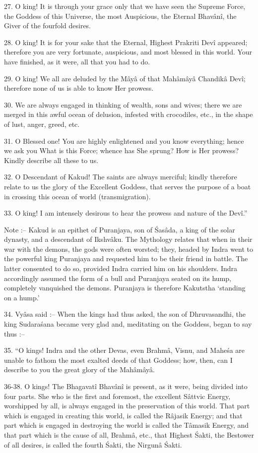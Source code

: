 27. O king! It is through your grace only that we have seen the Supreme Force, the Goddess of this Universe, the most Auspicious, the Eternal Bhav\^an\^i, the Giver of the fourfold desires.

28. O king! It is for your sake that the Eternal, Highest Prakriti Dev\^i appeared; therefore you are very fortunate, auspicious, and most blessed in this world. Your have finished, as it were, all that you had to do.

29. O king! We all are deluded by the M\^ay\^a of that Mah\^am\^ay\^a Chandik\^a Dev\^i; therefore none of us is able to know Her prowess.

30. We are always engaged in thinking of wealth, sons and wives; there we are merged in this awful ocean of delusion, infested with crocodiles, etc., in the shape of lust, anger, greed, etc.

31. O Blessed one! You are highly enlightened and you know everything; hence we ask you What is this Force; whence has She sprung? How is Her prowess? Kindly describe all these to us.

32. O Descendant of Kakud! The saints are always merciful; kindly therefore relate to us the glory of the Excellent Goddess, that serves the purpose of a boat in crossing this ocean of world (transmigration).

33. O king! I am intensely desirous to hear the prowess and nature of the Dev\^i.''

Note :-- Kakud is an epithet of Puranjaya, son of \'Sas\^ada, a king of the solar dynasty, and a descendant of Ikshv\^aku. The Mythology relates that when in their war with the demons, the gods were often worsted; they, headed by Indra went to the powerful king Puranjaya and requested him to be their friend in battle. The latter consented to do so, provided Indra carried him on his shoulders. Indra accordingly assumed the form of a bull and Puranjaya seated on its hump, completely vanquished the demons. Puranjaya is therefore Kakutstha ‘standing on a hump.'

34. Vy\^asa said :-- When the kings had thus asked, the son of Dhruvasandhi, the king Sudara\'sana became very glad and, meditating on the Goddess, began to say thus :--

35. ``O kings! Indra and the other Devas, even Brahm\^a, Visnu, and Mahe\'sa are unable to fathom the most exalted deeds of that Goddess; how, then, can I describe to you the great glory of the Mah\^am\^ay\^a.

36-38. O kings! The Bhagavat\^i Bhav\^an\^i is present, as it were, being divided into four parts. She who is the first and foremost, the excellent S\^attvic Energy, worshipped by all, is always engaged in the preservation of this world. That part which is engaged in creating this world, is called the R\^ajasik Energy; and that part which is engaged in destroying the world is called the T\^amasik Energy, and that part which is the cause of all, Brahm\^a, etc., that Highest \'Sakti, the Bestower of all desires, is called the fourth \'Sakti, the Nirgun\^a \'Sakti.

